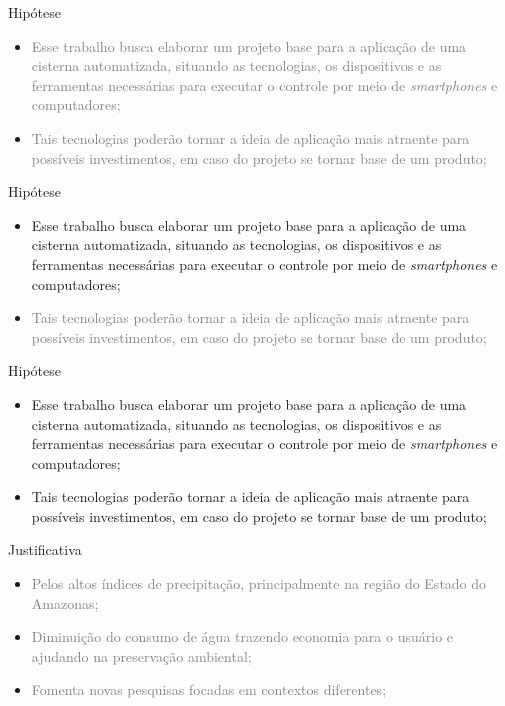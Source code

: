 \begin{frame}{Hipótese}
\begin{itemize}
  \item \textcolor{gray}{Esse trabalho busca elaborar um projeto base para a aplicação de uma cisterna automatizada, situando as tecnologias, os dispositivos e as ferramentas necessárias para executar o controle por meio de \textit{smartphones} e computadores;}
  \item \textcolor{gray}{Tais tecnologias poderão tornar a ideia de aplicação mais atraente para possíveis investimentos, em caso do projeto se tornar base de um produto;}
\end{itemize}
\end{frame}

\begin{frame}{Hipótese}
  \begin{itemize}
    \item {Esse trabalho busca elaborar um projeto base para a aplicação de uma cisterna automatizada, situando as tecnologias, os dispositivos e as ferramentas necessárias para executar o controle por meio de \textit{smartphones} e computadores;}
    \item \textcolor{gray}{Tais tecnologias poderão tornar a ideia de aplicação mais atraente para possíveis investimentos, em caso do projeto se tornar base de um produto;}
  \end{itemize}
\end{frame}

  \begin{frame}{Hipótese}
    \begin{itemize}
      \item {Esse trabalho busca elaborar um projeto base para a aplicação de uma cisterna automatizada, situando as tecnologias, os dispositivos e as ferramentas necessárias para executar o controle por meio de \textit{smartphones} e computadores;}
      \item {Tais tecnologias poderão tornar a ideia de aplicação mais atraente para possíveis investimentos, em caso do projeto se tornar base de um produto;}
    \end{itemize}
\end{frame}

\begin{frame}{Justificativa}
  \begin{itemize}
    \item \textcolor{gray}{Pelos altos índices de precipitação, principalmente na região do Estado do Amazonas;}
    \item \textcolor{gray}{Diminuição do consumo de água trazendo economia para o usuário e ajudando na preservação ambiental;}
    \item  \textcolor{gray}{Fomenta novas pesquisas focadas em contextos diferentes;}
  \end{itemize}
\end{frame}

